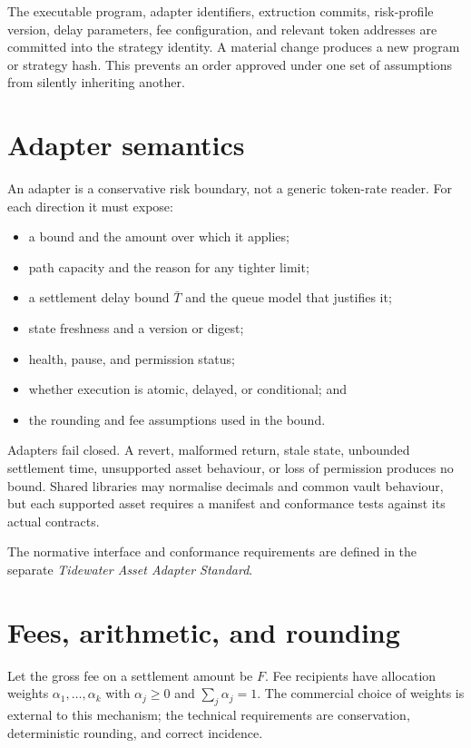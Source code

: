\documentclass[10pt,twocolumn]{article}
\theoremstyle{definition}
\begin{document}
The executable program, adapter identifiers, extruction commits, risk-profile version, delay parameters, fee
configuration, and relevant token addresses are committed into the strategy identity. A material change produces a
new program or strategy hash. This prevents an order approved under one set of assumptions from silently
inheriting another.

\section{Adapter semantics}

An adapter is a conservative risk boundary, not a generic token-rate reader. For each direction it must expose:

\begin{itemize}[label=--]
  \item a bound and the amount over which it applies;
  \item path capacity and the reason for any tighter limit;
  \item a settlement delay bound $\bar T$ and the queue model that justifies it;
  \item state freshness and a version or digest;
  \item health, pause, and permission status;
  \item whether execution is atomic, delayed, or conditional; and
  \item the rounding and fee assumptions used in the bound.
\end{itemize}

Adapters fail closed. A revert, malformed return, stale state, unbounded settlement time, unsupported asset
behaviour, or loss of permission produces no bound. Shared libraries may normalise decimals and common vault
behaviour, but each supported asset requires a manifest and conformance tests against its actual contracts.

The normative interface and conformance requirements are defined in the separate \emph{Tidewater Asset Adapter
Standard}.

\section{Fees, arithmetic, and rounding}

Let the gross fee on a settlement amount be $F$. Fee recipients have allocation weights $\alpha_1,\dots,\alpha_k$
with $\alpha_j \ge 0$ and $\sum_j \alpha_j = 1$. The commercial choice of weights is external to this mechanism;
the technical requirements are conservation, deterministic rounding, and correct incidence.
\end{document}
